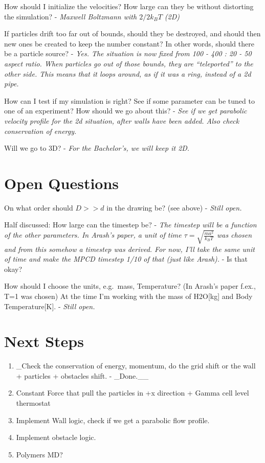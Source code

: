 \documentclass[
]{article}
\providecommand{\tightlist}{%
  \setlength{\itemsep}{0pt}\setlength{\parskip}{0pt}}
\begin{document}
How should I initialize the velocities? How large can they be without
distorting the simulation? - \emph{Maxwell Boltzmann with \(2/2 k_B T\)
(2D)}

If particles drift too far out of bounds, should they be destroyed, and
should then new ones be created to keep the number constant? In other
words, should there be a particle source? - \emph{Yes. The situation is
now fixed from 100 - 400 : 20 - 50 aspect ratio. When particles go out
of those bounds, they are ``teleported'' to the other side. This means
that it loops around, as if it was a ring, instead of a 2d pipe.}

How can I test if my simulation is right? See if some parameter can be
tuned to one of an experiment? How should we go about this? - \emph{See
if we get parabolic velocity profile for the 2d situation, after walls
have been added. Also check conservation of energy.}

Will we go to 3D? - \emph{For the Bachelor's, we will keep it 2D.}

\hypertarget{open-questions}{%
\section{Open Questions}\label{open-questions}}

On what order should \(D >> d\) in the drawing be? (see above) -
\emph{Still open.}

Half discussed: How large can the timestep be? - \emph{The timestep will
be a function of the other parameters. In Arash's paper, a unit of time
\(\tau = \sqrt{\frac{m a^2}{k_B T}}\) was chosen and from this somehow a
timestep was derived. For now, I'll take the same unit of time and make
the MPCD timestep 1/10 of that (just like Arash).} - Is that okay?

How should I choose the units, e.g.~mass, Temperature? (In Arash's paper
f.ex., T=1 was chosen) At the time I'm working with the mass of
H2O{[}kg{]} and Body Temperature{[}K{]}. - \emph{Still open.}

\hypertarget{next-steps}{%
\section{Next Steps}\label{next-steps}}

\begin{enumerate}
\def\labelenumi{\arabic{enumi}.}
\tightlist
\item
  \_Check the conservation of energy, momentum, do the grid shift or the
  wall + particles + obstacles shift. - \_Done.\_\_
\item
  Constant Force that pull the particles in +x direction + Gamma cell
  level thermostat
\item
  Implement Wall logic, check if we get a parabolic flow profile.
\item
  Implement obstacle logic.
\item
  Polymers MD?
\end{enumerate}
\end{document}
